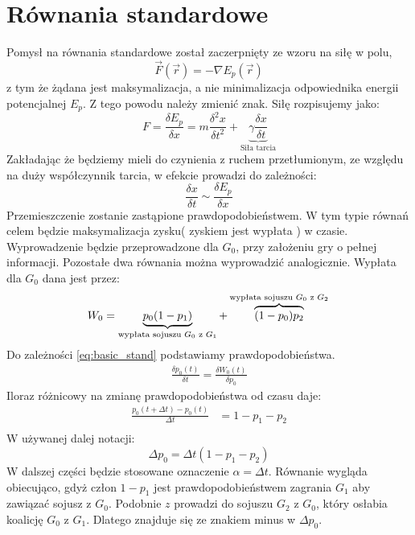 \section{Równania standardowe}
\label{sec:r_stand}
Pomysł na równania standardowe został zaczerpnięty ze wzoru na siłę w polu,
\begin{equation}\label{eq:fiz_stand}
\overrightarrow{F}(\overrightarrow{r})=-\nabla E_p (\overrightarrow{r})
\end{equation}
z tym że żądana jest maksymalizacja, a nie minimalizacja odpowiednika energii potencjalnej $E_p$. Z tego powodu należy zmienić znak. Siłę rozpisujemy jako:
\begin{equation*}
F=\frac{\delta E_p}{\delta x} = m\frac{\delta^2x}{\delta t^2} + \underbrace{\gamma \frac{\delta x}{\delta t}}_{\text{Siła tarcia}}
\end{equation*}
Zakładając że będziemy mieli do czynienia z ruchem przetłumionym, ze względu na duży współczynnik tarcia, w efekcie prowadzi do zależności:
\begin{equation}\label{eq:basic_stand}
\frac{\delta x}{\delta t} \sim \frac{\delta E_p}{\delta x}
\end{equation}
Przemieszczenie zostanie zastąpione prawdopodobieństwem. W tym typie równań celem będzie maksymalizacja zysku( zyskiem jest wypłata ) w czasie. Wyprowadzenie będzie przeprowadzone dla $G_0$, przy założeniu gry o pełnej informacji. Pozostałe dwa równania można wyprowadzić analogicznie. Wypłata dla $G_0$ dana jest przez:
\begin{equation}\label{eq:wypl_stand}
W_0 = \underbrace{p_0(1-p_1)}_{\text{wypłata sojuszu $G_0$ z $G_1$}} + \overbrace{(1-p_0)p_2}^{\text{wypłata sojuszu $G_0$ z $G_2$}} \\
\end{equation}
Do zależności \ref{eq:basic_stand} podstawiamy prawdopodobieństwa.
\begin{align*}
\frac{\delta p_0(t)}{\delta t} = \frac{\delta W_0(t)}{\delta p_0}
\end{align*}
Iloraz różnicowy na zmianę prawdopodobieństwa od czasu daje:
\begin{align}
\frac{p_0(t+\Delta t)-p_0(t)}{\Delta t} &= 1-p_1-p_2 \nonumber\\
\end{align}
W używanej dalej notacji:
\begin{equation}\label{eq:dynam_stand}
\Delta p_0 = \Delta t (1-p_1-p_2)
\end{equation}
W dalszej części będzie stosowane oznaczenie $\alpha = \Delta t$. Równanie wygląda obiecująco, gdyż człon $1 - p_1$ jest prawdopodobieństwem zagrania $G_1$ aby zawiązać sojusz z $G_0$. Podobnie $z$ prowadzi do sojuszu $G_2$ z $G_0$, który osłabia koalicję $G_0$ z $G_1$. Dlatego znajduje się ze znakiem minus w $\Delta p_0$.


